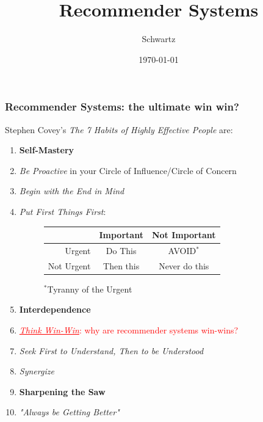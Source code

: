 \documentclass[xcolor={dvipsnames}]{beamer}
\title{Recommender Systems}
\author{Schwartz}
\date{\today}
\begin{document}
\frame{\titlepage}

\frame
{
\frametitle{Recommender Systems: the ultimate win win?}

Stephen Covey's \emph{The 7 Habits of Highly Effective People} are:

\begin{enumerate}
\item[]  \textbf{Self-Mastery}
\item \emph{Be Proactive} in your Circle of Influence/Circle of Concern
\item \emph{Begin with the End in Mind}
\item \emph{Put First Things First}: 

\vspace{1em}
\begin{figure}

\begin{tabular}{|r||c|c|}
\hline
&Important& Not Important\\\hline\hline
Urgent & Do This & AVOID$^*$\\\hline
Not Urgent & Then this & Never do this\\\hline
\end{tabular}

\vspace{.5em}
$^*$Tyranny of the Urgent
\end{figure}

\vspace{.5em}

\item[]  \textbf{Interdependence}
\item \textcolor{red}{\underline{\emph{Think Win-Win}}: why are recommender systems win-wins?}
\item \emph{Seek First to Understand, Then to be Understood}
\item \emph{Synergize}
\item[]  \textbf{Sharpening the Saw}
\item \emph{"Always be Getting Better"}
\end{enumerate}

}
\end{document}
